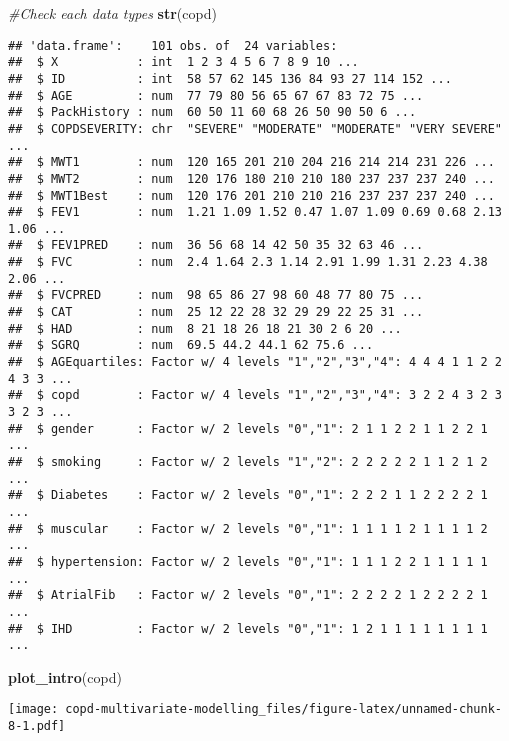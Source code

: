 \documentclass[
]{article}
\newenvironment{Shaded}{\begin{snugshade}}{\end{snugshade}}
\newcommand{\CommentTok}[1]{\textcolor[rgb]{0.56,0.35,0.01}{\textit{#1}}}
\newcommand{\FunctionTok}[1]{\textcolor[rgb]{0.13,0.29,0.53}{\textbf{#1}}}
\newcommand{\NormalTok}[1]{#1}
\begin{document}
\begin{Shaded}
\begin{Highlighting}[]
\CommentTok{\#Check each data types}
\FunctionTok{str}\NormalTok{(copd)}
\end{Highlighting}
\end{Shaded}

\begin{verbatim}
## 'data.frame':    101 obs. of  24 variables:
##  $ X           : int  1 2 3 4 5 6 7 8 9 10 ...
##  $ ID          : int  58 57 62 145 136 84 93 27 114 152 ...
##  $ AGE         : num  77 79 80 56 65 67 67 83 72 75 ...
##  $ PackHistory : num  60 50 11 60 68 26 50 90 50 6 ...
##  $ COPDSEVERITY: chr  "SEVERE" "MODERATE" "MODERATE" "VERY SEVERE" ...
##  $ MWT1        : num  120 165 201 210 204 216 214 214 231 226 ...
##  $ MWT2        : num  120 176 180 210 210 180 237 237 237 240 ...
##  $ MWT1Best    : num  120 176 201 210 210 216 237 237 237 240 ...
##  $ FEV1        : num  1.21 1.09 1.52 0.47 1.07 1.09 0.69 0.68 2.13 1.06 ...
##  $ FEV1PRED    : num  36 56 68 14 42 50 35 32 63 46 ...
##  $ FVC         : num  2.4 1.64 2.3 1.14 2.91 1.99 1.31 2.23 4.38 2.06 ...
##  $ FVCPRED     : num  98 65 86 27 98 60 48 77 80 75 ...
##  $ CAT         : num  25 12 22 28 32 29 29 22 25 31 ...
##  $ HAD         : num  8 21 18 26 18 21 30 2 6 20 ...
##  $ SGRQ        : num  69.5 44.2 44.1 62 75.6 ...
##  $ AGEquartiles: Factor w/ 4 levels "1","2","3","4": 4 4 4 1 1 2 2 4 3 3 ...
##  $ copd        : Factor w/ 4 levels "1","2","3","4": 3 2 2 4 3 2 3 3 2 3 ...
##  $ gender      : Factor w/ 2 levels "0","1": 2 1 1 2 2 1 1 2 2 1 ...
##  $ smoking     : Factor w/ 2 levels "1","2": 2 2 2 2 2 1 1 2 1 2 ...
##  $ Diabetes    : Factor w/ 2 levels "0","1": 2 2 2 1 1 2 2 2 2 1 ...
##  $ muscular    : Factor w/ 2 levels "0","1": 1 1 1 1 2 1 1 1 1 2 ...
##  $ hypertension: Factor w/ 2 levels "0","1": 1 1 1 2 2 1 1 1 1 1 ...
##  $ AtrialFib   : Factor w/ 2 levels "0","1": 2 2 2 2 1 2 2 2 2 1 ...
##  $ IHD         : Factor w/ 2 levels "0","1": 1 2 1 1 1 1 1 1 1 1 ...
\end{verbatim}

\begin{Shaded}
\begin{Highlighting}[]
\FunctionTok{plot\_intro}\NormalTok{(copd)}
\end{Highlighting}
\end{Shaded}

\texttt{[image: copd-multivariate-modelling\_files/figure-latex/unnamed-chunk-8-1.pdf]}
\end{document}
